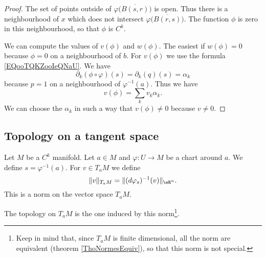 \begin{proof}
    The set of points outside of \( \varphi\big( \overline{ B(s,r) } \big)\) is open. Thus there is a neighbourhood of \( x\) which does not intersect \( \varphi\big( \overline{ B(r,s) } \big)\). The function \( \phi\) is zero in this neighbourhood, so that \( \phi\) is \(  C^k\).

    We can compute the values of \( v(\phi)\) and \( w(\phi)\). The easiest if \( w(\phi)=0\) because \( \phi=0\) on a neighbourhood of \( b\). For \( v(\phi)\) we use the formula \ref{EQooTQKZooIeQNaU}. We have
    \begin{equation}
        \partial_k(\phi\circ\varphi)(s)=\partial_k(q)(s)=\alpha_k
    \end{equation}
    because \( p=1\) on a neighbourhood of \( \varphi^{-1}(a)\). Thus we have
    \begin{equation}
        v(\phi)=\sum_kv_k\alpha_k.
    \end{equation}
    We can choose the \( \alpha_k\) in such a way that \( v(\phi)\neq 0\) because \( v\neq 0\).
\end{proof}

\subsection{Topology on a tangent space}

\begin{propositionDef}        \label{PROPooHJOXooMGANfd}
    Let \( M\) be a \( C^k\) manifold. Let \( a\in M\) and \( \varphi\colon U\to M\) be a chart around \( a\). We define \( s=\varphi^{-1}(a)\). For \( v\in T_aM\) we define
    \begin{equation}
        \| v \|_{T_aM}=\| (d\varphi_s)^{-1}(v) \|_{\eR^n}.
    \end{equation}
    This is a norm on the vector space \( T_aM\).

    The topology on \( T_aM\) is the one induced by this norm\footnote{Keep in mind that, since \( T_aM\) is finite dimensional, all the norm are equivalent (theorem \ref{ThoNormesEquiv}), so that this norm is not special.}.
\end{propositionDef}

